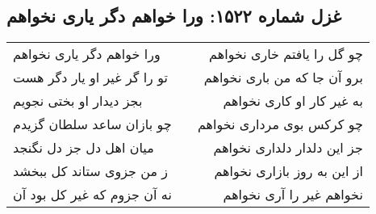 \begin{center}
\section*{غزل شماره ۱۵۲۲: ورا خواهم دگر یاری نخواهم}
\label{sec:1522}
\begin{longtable}{l p{0.5cm} r}
ورا خواهم دگر یاری نخواهم
&&
چو گل را یافتم خاری نخواهم
\\
تو را گر غیر او یار دگر هست
&&
برو آن جا که من باری نخواهم
\\
بجز دیدار او بختی نجویم
&&
به غیر کار او کاری نخواهم
\\
چو بازان ساعد سلطان گزیدم
&&
چو کرکس بوی مرداری نخواهم
\\
میان اهل دل جز دل نگنجد
&&
جز این دلدار دلداری نخواهم
\\
ز من جزوی ستاند کل ببخشد
&&
از این به روز بازاری نخواهم
\\
نه آن جزوم که غیر کل بود آن
&&
نخواهم غیر را آری نخواهم
\\
\end{longtable}
\end{center}
